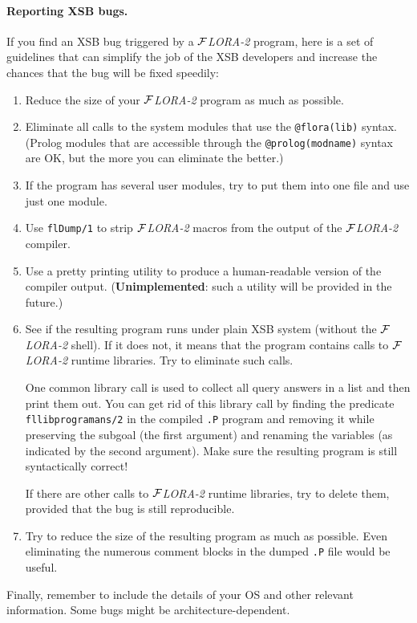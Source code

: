 \documentclass[11pt]{article}
\newcommand{\FLORA}{{\mbox{${\cal F}${\small\it LORA}\rm\emph{-2}}}\xspace}
\begin{document}
\paragraph{Reporting XSB bugs.}
If you find an XSB bug triggered by a \FLORA program, here is a set of
guidelines that can simplify the job of the XSB developers and increase the
chances that the bug will be fixed speedily:
\begin{enumerate}
  \item  Reduce the size of your \FLORA program as much as possible.
  \item  Eliminate all calls to the system modules that use the
    {\tt @flora(lib)} syntax. (Prolog modules that are accessible
    through the {\tt @prolog(modname)} syntax are OK, but the more you can
    eliminate the better.)
  \item If the program has several user modules, try to put them into one
    file and use just one module. 
  \item  Use {\tt flDump/1} to strip \FLORA macros from the output of the
    \FLORA compiler.
  \item  Use a pretty printing utility to produce a human-readable 
    version of the compiler output. ({\bf Unimplemented}: such a utility
    will be provided in the future.)
  \item  See if the resulting program runs under plain XSB system (without
    the \FLORA shell). If it does not, it means that the program contains
    calls to \FLORA runtime libraries. Try to eliminate such calls.

    One common library call is used to collect all query answers in a list
    and then print them out. You can get rid of this library call by
    finding the predicate {\tt fllibprogramans/2} in the compiled {\tt .P}
    program and removing it while preserving the subgoal (the first
    argument) and renaming the variables (as indicated by the second argument).
    Make sure the resulting program is still syntactically correct!
    
    If there are other calls to \FLORA runtime libraries, try to delete
    them, provided that the bug is still reproducible.
  \item Try to reduce the size of the resulting program as much as possible.
    Even eliminating the numerous comment blocks in the dumped {\tt .P}
    file would be useful.
\end{enumerate}
Finally, remember to include the details of your OS and other relevant
information. Some bugs might be architecture-dependent.
\end{document}
